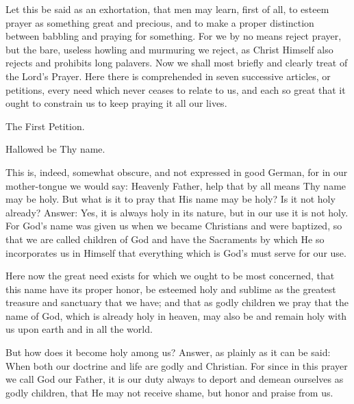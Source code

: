 Let this be said as an exhortation, that men may learn, first of all,
to esteem prayer as something great and precious, and to make a proper
distinction between babbling and praying for something. For we by no
means reject prayer, but the bare, useless howling and murmuring we
reject, as Christ Himself also rejects and prohibits long palavers. Now
we shall most briefly and clearly treat of the Lord's Prayer. Here
there is comprehended in seven successive articles, or petitions, every
need which never ceases to relate to us, and each so great that it
ought to constrain us to keep praying it all our lives.

 The First Petition.

Hallowed be Thy name.

This is, indeed, somewhat obscure, and not expressed in good German,
for in our mother-tongue we would say: Heavenly Father, help that by
all means Thy name may be holy. But what is it to pray that His name
may be holy? Is it not holy already? Answer: Yes, it is always holy in
its nature, but in our use it is not holy. For God's name was given us
when we became Christians and were baptized, so that we are called
children of God and have the Sacraments by which He so incorporates us
in Himself that everything which is God's must serve for our use.

Here now the great need exists for which we ought to be most
concerned, that this name have its proper honor, be esteemed holy and
sublime as the greatest treasure and sanctuary that we have; and that
as godly children we pray that the name of God, which is already holy
in heaven, may also be and remain holy with us upon earth and in all
the world.

But how does it become holy among us? Answer, as plainly as it can be
said: When both our doctrine and life are godly and Christian. For
since in this prayer we call God our Father, it is our duty always to
deport and demean ourselves as godly children, that He may not receive
shame, but honor and praise from us.

